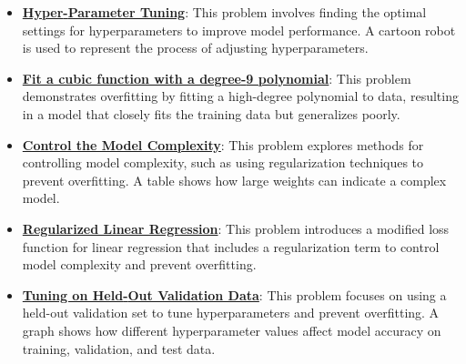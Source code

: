 \documentclass{article}%
\begin{document}
\begin{itemize}[leftmargin=*]
\item \href{https://purdue.brightspace.com/d2l/common/assets/pdfjs-d2l-dist/1.0.14-legacy/web/viewer.html?file=\%2Fcontent\%2Fenforced\%2F1095467-wl.202510.CS.24300.001\%2F10L1-CrossValidation.pdf\%3Fou\%3D1095467\&lang=en-us\&container=d2l-fileviewer-rendered-pdf\&fullscreen=d2l-fileviewer-rendered-pdf-dialog\&height=667#page=14}{\textbf{Hyper{-}Parameter Tuning}}: This problem involves finding the optimal settings for hyperparameters to improve model performance. A cartoon robot is used to represent the process of adjusting hyperparameters.%
\item \href{https://purdue.brightspace.com/d2l/common/assets/pdfjs-d2l-dist/1.0.14-legacy/web/viewer.html?file=\%2Fcontent\%2Fenforced\%2F1095467-wl.202510.CS.24300.001\%2F10L1-CrossValidation.pdf\%3Fou\%3D1095467\&lang=en-us\&container=d2l-fileviewer-rendered-pdf\&fullscreen=d2l-fileviewer-rendered-pdf-dialog\&height=667#page=15}{\textbf{Fit a cubic function with a degree{-}9 polynomial}}: This problem demonstrates overfitting by fitting a high-degree polynomial to data, resulting in a model that closely fits the training data but generalizes poorly.%
\item \href{https://purdue.brightspace.com/d2l/common/assets/pdfjs-d2l-dist/1.0.14-legacy/web/viewer.html?file=\%2Fcontent\%2Fenforced\%2F1095467-wl.202510.CS.24300.001\%2F10L1-CrossValidation.pdf\%3Fou\%3D1095467\&lang=en-us\&container=d2l-fileviewer-rendered-pdf\&fullscreen=d2l-fileviewer-rendered-pdf-dialog\&height=667#page=16}{\textbf{Control the Model Complexity}}: This problem explores methods for controlling model complexity, such as using regularization techniques to prevent overfitting. A table shows how large weights can indicate a complex model.%
\item \href{https://purdue.brightspace.com/d2l/common/assets/pdfjs-d2l-dist/1.0.14-legacy/web/viewer.html?file=\%2Fcontent\%2Fenforced\%2F1095467-wl.202510.CS.24300.001\%2F10L1-CrossValidation.pdf\%3Fou\%3D1095467\&lang=en-us\&container=d2l-fileviewer-rendered-pdf\&fullscreen=d2l-fileviewer-rendered-pdf-dialog\&height=667#page=17}{\textbf{Regularized Linear Regression}}: This problem introduces a modified loss function for linear regression that includes a regularization term to control model complexity and prevent overfitting.%
\item \href{https://purdue.brightspace.com/d2l/common/assets/pdfjs-d2l-dist/1.0.14-legacy/web/viewer.html?file=\%2Fcontent\%2Fenforced\%2F1095467-wl.202510.CS.24300.001\%2F10L1-CrossValidation.pdf\%3Fou\%3D1095467\&lang=en-us\&container=d2l-fileviewer-rendered-pdf\&fullscreen=d2l-fileviewer-rendered-pdf-dialog\&height=667#page=19}{\textbf{Tuning on Held{-}Out Validation Data}}: This problem focuses on using a held-out validation set to tune hyperparameters and prevent overfitting. A graph shows how different hyperparameter values affect model accuracy on training, validation, and test data.%

\end{itemize}
\end{document}
